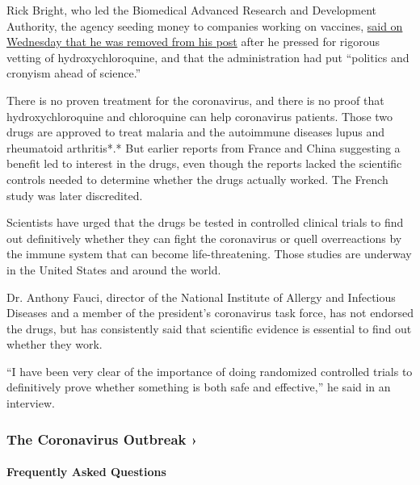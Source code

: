 Rick Bright, who led the Biomedical Advanced Research and Development
Authority, the agency seeding money to companies working on vaccines,
\href{https://www.nytimes.com/2020/04/22/us/politics/rick-bright-trump-hydroxychloroquine-coronavirus.html}{said
on Wednesday that he was removed from his post} after he pressed for
rigorous vetting of hydroxychloroquine, and that the administration had
put ``politics and cronyism ahead of science.''

There is no proven treatment for the coronavirus, and there is no proof
that hydroxychloroquine and chloroquine can help coronavirus patients.
Those two drugs are approved to treat malaria and the autoimmune
diseases lupus and rheumatoid arthritis*.* But earlier reports from
France and China suggesting a benefit led to interest in the drugs, even
though the reports lacked the scientific controls needed to determine
whether the drugs actually worked. The French study was later
discredited.

Scientists have urged that the drugs be tested in controlled clinical
trials to find out definitively whether they can fight the coronavirus
or quell overreactions by the immune system that can become
life-threatening. Those studies are underway in the United States and
around the world.

Dr. Anthony Fauci, director of the National Institute of Allergy and
Infectious Diseases and a member of the president's coronavirus task
force, has not endorsed the drugs, but has consistently said that
scientific evidence is essential to find out whether they work.

``I have been very clear of the importance of doing randomized
controlled trials to definitively prove whether something is both safe
and effective,'' he said in an interview.

\href{https://www.nytimes.com/news-event/coronavirus?action=click\&pgtype=Article\&state=default\&region=MAIN_CONTENT_3\&context=storylines_faq}{}

\hypertarget{the-coronavirus-outbreak-}{%
\subsubsection{The Coronavirus Outbreak
›}\label{the-coronavirus-outbreak-}}

\hypertarget{frequently-asked-questions}{%
\paragraph{Frequently Asked
Questions}\label{frequently-asked-questions}}

